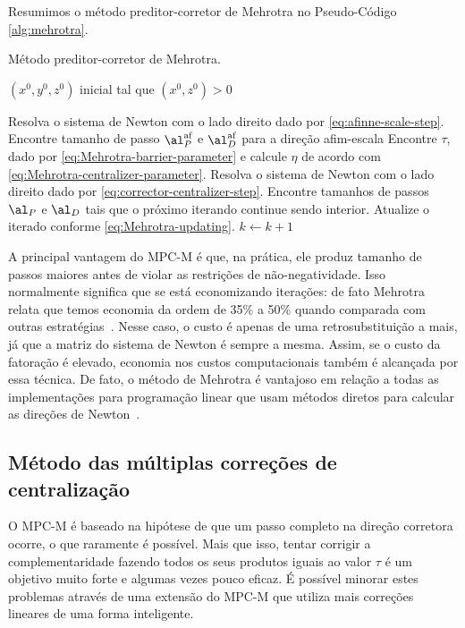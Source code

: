  Resumimos o método preditor-corretor de Mehrotra no Pseudo-Código
 \ref{alg:mehrotra}.
 \begin{algorithm}
\caption{Método preditor-corretor de Mehrotra.}
\label{alg:mehrotra}
\begin{algorithmic}[0] 
\Require $(x^0,y^0,z^0)$ inicial tal que $(x^0,z^0) > 0$ 

	\Repeat
		\State Resolva o sistema de Newton com o lado direito dado por
		\eqref{eq:afinne-scale-step}. 
		 \State Encontre tamanho de passo $\al_P^{\text{af}}$ e $\al_D^{\text{af}}$
		 para a direção afim-escala \State Encontre $\tau$, dado por \eqref{eq:Mehrotra-barrier-parameter} e
		 calcule $\eta$ de acordo com \eqref{eq:Mehrotra-centralizer-parameter}.
		 \State Resolva o sistema de Newton com o lado direito dado por
		  \eqref{eq:corrector-centralizer-step}.
		  \State Encontre tamanhos de passos $\al_P$ e $\al_D$  tais que o próximo iterando continue sendo interior. 
		  \State Atualize o iterado conforme 
		  \eqref{eq:Mehrotra-updating}.
		   \State $k\gets k+1$

\end{algorithmic}
\end{algorithm}
 
 
 A principal vantagem do \ac{MPC-M} é que, na prática, ele produz tamanho de
 passos maiores antes de violar as restrições de não-negatividade. Isso normalmente
 significa que se está economizando  iterações: de fato Mehrotra relata
 que temos economia da ordem de 35\% a 50\% quando comparada com outras
 estratégias~\cite{Mehrotra:1992wr}. Nesse
 caso, o custo é apenas de uma retrosubstituição a mais, já que a matriz do
 sistema de Newton é sempre a mesma. Assim, se o custo da fatoração é elevado,
 economia nos custos computacionais também é alcançada por essa técnica. De 
 fato, o método de Mehrotra é vantajoso em relação a todas as implementações
 para programação linear que usam métodos diretos para calcular as direções de
 Newton~\cite[pg. 40]{Colombo:2008wm}.
 
 
 \subsection{Método das múltiplas correções de centralização}
 
O \acl{MPC-M} é baseado na hipótese de que um passo
completo na direção corretora ocorre, o que raramente é possível. Mais que
isso,  tentar corrigir a complementaridade fazendo todos os seus produtos
iguais ao valor $\tau$ é um objetivo muito forte e algumas vezes pouco eficaz. 
É possível minorar estes problemas através de uma extensão do \ac{MPC-M}
que utiliza mais correções lineares de uma forma inteligente.

